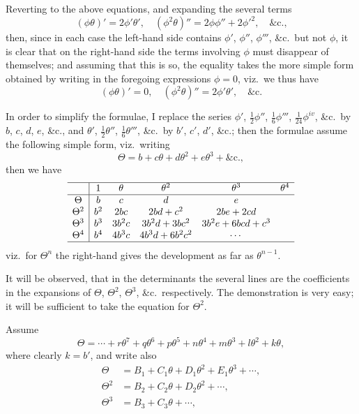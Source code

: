 \documentclass[11pt,a4paper]{book}
\begin{document}
Reverting to the above equations, and expanding the several terms
\[
(\phi\theta)' = 2\phi'\theta', \quad
(\phi^2\theta)'' = 2\phi\phi'' + 2\phi'^2, \quad \text{\&c.,}
\]
then, since in each case the left-hand side contains $\phi'$, $\phi''$, $\phi'''$, \&c.\ but not $\phi$, it is clear that on the right-hand side the terms involving $\phi$ must disappear of themselves; and assuming that this is so, the equality takes the more simple form obtained by writing in the foregoing expressions $\phi = 0$, viz.\ we thus have
\[
(\phi\theta)' = 0, \quad (\phi^2\theta)'' = 2\phi'\theta', \quad \text{\&c.}
\]

In order to simplify the formulae, I replace the series $\phi'$, $\frac{1}{2}\phi''$, $\frac{1}{6}\phi'''$, $\frac{1}{24}\phi^{iv}$, \&c.\ by $b$, $c$, $d$, $e$, \&c., and $\theta'$, $\frac{1}{2}\theta''$, $\frac{1}{6}\theta'''$, \&c.\ by $b'$, $c'$, $d'$, \&c.; then the formulae assume the following simple form, viz.\ writing
\[
\Theta = b + c\theta + d\theta^2 + e\theta^3 + \&\text{c.},
\]
then we have
\[
\begin{array}{c|ccccc}
\hline
& 1 & \theta & \theta^2 & \theta^3 & \theta^4 \\
\hline
\Theta & b & c & d & e & \\
\Theta^2 & b^2 & 2bc & 2bd + c^2 & 2be + 2cd & \\
\Theta^3 & b^3 & 3b^2c & 3b^2d + 3bc^2 & 3b^2e + 6bcd + c^3 & \\
\Theta^4 & b^4 & 4b^3c & 4b^3d + 6b^2c^2 & \cdots & \\
\hline
\end{array}
\]
viz.\ for $\Theta^n$ the right-hand gives the development as far as $\theta^{n-1}$.

It will be observed, that in the determinants the several lines are the coefficients in the expansions of $\Theta$, $\Theta^2$, $\Theta^3$, \&c.\ respectively. The demonstration is very easy; it will be sufficient to take the equation for $\Theta^2$.

Assume
\[
\Theta = \cdots + r\theta^7 + q\theta^6 + p\theta^5 + n\theta^4 + m\theta^3 + l\theta^2 + k\theta,
\]
where clearly $k = b'$, and write also
\begin{align*}
\Theta &= B_1 + C_1\theta + D_1\theta^2 + E_1\theta^3 + \cdots, \\
\Theta^2 &= B_2 + C_2\theta + D_2\theta^2 + \cdots, \\
\Theta^3 &= B_3 + C_3\theta + \cdots,
\end{align*}
\end{document}
